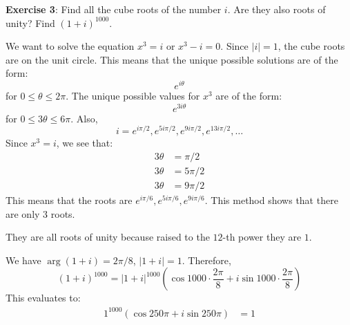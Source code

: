 \documentclass{article}
\begin{document}
\newpage

\textbf{Exercise 3}: Find all the cube roots of the number $i$. Are they also roots of unity? Find $(1 + i)^{1000}$. 
    \begin{answer}
        We want to solve the equation $x^{3} = i$ or $x^{3} - i = 0$. Since $\lvert i \rvert = 1$, the cube roots are on the unit circle. This means that the unique possible solutions are of the form:
            \begin{equation*}
                e^{i\theta}
            \end{equation*}
        for $0 \leq \theta \leq 2\pi$. The unique possible values for $x^{3}$ are of the form:
            \begin{equation*}
                e^{3i\theta}
            \end{equation*}
        for $0 \leq 3\theta \leq 6\pi$. Also,
            \begin{equation*}
                i = e^{i\pi/2}, e^{5i\pi/2}, e^{9i\pi/2}, e^{13i\pi/2}, \ldots
            \end{equation*}
        Since $x^{3} = i$, we see that:
            \begin{align*}
                3\theta &= \pi/2  \\
                3\theta &= 5\pi/2 \\
                3\theta &= 9\pi/2   
            \end{align*}
        This means that the roots are $e^{i\pi/6}, e^{5i\pi/6}, e^{9i\pi/6}$. This method shows that there are only $3$ roots. 

        They are all roots of unity because raised to the $12$-th power they are $1$. 

        We have $\mathop{arg}(1 + i) = 2\pi/8$, $\lvert 1 + i \rvert = 1$. Therefore,
            \begin{equation*}
                (1 + i)^{1000} = \lvert 1 + i \rvert^{1000}(\cos{1000 \cdot \dfrac{2\pi}{8}} + i \sin{1000 \cdot \dfrac{2\pi}{8}})
            \end{equation*}
        This evaluates to:
            \begin{align*}
                1^{1000}(\cos{250\pi} + i\sin{250\pi}) &= 1   
            \end{align*}
    \end{answer}

\newpage
\end{document}
